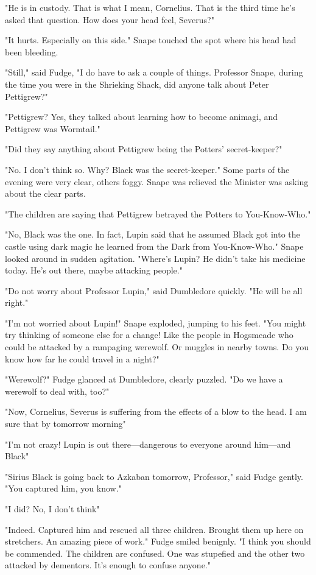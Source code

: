 "He is in custody. That is what I mean, Cornelius. That is the third time he's asked that question. How does your head feel, Severus?"

"It hurts. Especially on this side." Snape touched the spot where his head had been bleeding.

"Still," said Fudge, "I do have to ask a couple of things. Professor Snape, during the time you were in the Shrieking Shack, did anyone talk about Peter Pettigrew?"

"Pettigrew? Yes, they talked about learning how to become animagi, and Pettigrew was Wormtail."

"Did they say anything about Pettigrew being the Potters' secret-keeper?"

"No. I don't think so. Why? Black was the secret-keeper." Some parts of the evening were very clear, others foggy. Snape was relieved the Minister was asking about the clear parts.

"The children are saying that Pettigrew betrayed the Potters to{\el} You-Know-Who."

"No, Black was the one. In fact, Lupin said that he assumed Black got into the castle using dark magic he learned from the Dark{\el} from You-Know-Who." Snape looked around in sudden agitation. "Where's Lupin? He didn't take his medicine today. He's out there, maybe attacking people."

"Do not worry about Professor Lupin," said Dumbledore quickly. "He will be all right."

"I'm not worried about Lupin!" Snape exploded, jumping to his feet. "You might try thinking of someone else for a change! Like the people in Hogsmeade who could be attacked by a rampaging werewolf. Or muggles in nearby towns. Do you know how far he could travel in a night?"

"Werewolf?" Fudge glanced at Dumbledore, clearly puzzled. "Do we have a werewolf to deal with, too?"

"Now, Cornelius, Severus is suffering from the effects of a blow to the head. I am sure that by tomorrow morning{\el}"

"I'm not crazy! Lupin is out there—dangerous to everyone around him—and Black{\el}"

"Sirius Black is going back to Azkaban tomorrow, Professor," said Fudge gently. "You captured him, you know."

"I did? No, I don't think{\el}"

"Indeed. Captured him and rescued all three children. Brought them up here on stretchers. An amazing piece of work." Fudge smiled benignly. "I think you should be commended. The children are confused. One was stupefied and the other two attacked by dementors. It's enough to confuse anyone."

